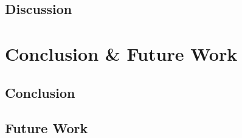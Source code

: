 \documentclass{article}
\begin{document}
\subsection{Discussion}

\section{Conclusion {\&} Future Work}

\subsection{Conclusion}
\subsection{Future Work}




\end{document}
